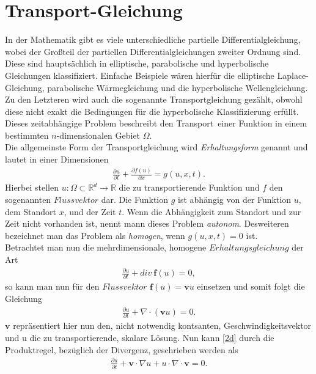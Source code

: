 \documentclass[a4paper,11pt]{article}
\begin{document}
\section{Transport-Gleichung}
In der Mathematik gibt es viele unterschiedliche partielle Differentialgleichung, wobei der Großteil der partiellen Differentialgleichungen zweiter Ordnung sind. Diese sind hauptsächlich in elliptische, parabolische und hyperbolische Gleichungen klassifiziert. Einfache Beispiele wären hierfür die elliptische Laplace-Gleichung, parabolische Wärmegleichung und die hyperbolische Wellengleichung. Zu den Letzteren wird auch die sogenannte Transportgleichung gezählt, obwohl diese nicht exakt die Bedingungen für die hyperbolische Klassifizierung erfüllt. Dieses zeitabhängige Problem beschreibt den \grqq Transport\grqq~einer Funktion in einem bestimmten $n$-dimensionalen Gebiet $\Omega$.\\
Die allgemeinste Form der Transportgleichung wird \textit{Erhaltungsform} genannt und lautet in einer Dimensionen
\begin{align}
 \frac{\partial u}{\partial t}+\frac{\partial f(u)}{\partial x}=g(u,x,t)\label{1d}.
\end{align}
Hierbei stellen $u:\Omega\subset\mathbb{R}^d\to\mathbb{R}$ die zu transportierende Funktion und $f$ den sogenannten $Flussvektor$ dar. Die Funktion $g$ ist abhängig von der Funktion $u$, dem Standort $x$, und der Zeit $t$. Wenn die Abhängigkeit zum Standort und zur Zeit nicht vorhanden ist, nennt mann dieses Problem \textit{autonom}. Desweiteren bezeichnet man das Problem als \textit{homogen}, wenn $g(u,x,t)=0$ ist.\\
Betrachtet man nun die mehrdimensionale, homogene $Erhaltungsgleichung$ der Art
\begin{align}
 \frac{\partial u}{\partial t}+div~\textbf{f}(u)=0,
\end{align}
so kann man nun für den $Flussvektor$ $\textbf{f}(u)=\textbf{v} u$ einsetzen und somit folgt die Gleichung
\begin{align}
 \frac{\partial u}{\partial t}+\nabla \cdot (\textbf{v}u)=0.\label{2d}
\end{align}
$\textbf{v}$ repräsentiert hier nun den, nicht notwendig kontsanten, Geschwindigkeitsvektor und u die zu transportierende, skalare Lösung. Nun kann \eqref{2d} durch die Produktregel, bezüglich der Divergenz, geschrieben werden als
\begin{align}
  \frac{\partial u}{\partial t}+\textbf{v}\cdot\nabla u + u \cdot \nabla \cdot\textbf{v}=0.
\end{align}
\end{document}
